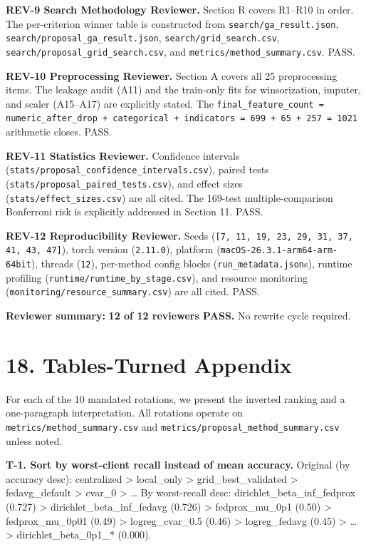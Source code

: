 \documentclass{article}
\begin{document}
\textbf{REV-9 Search Methodology Reviewer.} Section R covers R1--R10 in order. The per-criterion winner table is constructed from \texttt{search/ga\_result.json}, \texttt{search/proposal\_ga\_result.json}, \texttt{search/grid\_search.csv}, \texttt{search/proposal\_grid\_search.csv}, and \texttt{metrics/method\_summary.csv}. PASS.


\textbf{REV-10 Preprocessing Reviewer.} Section A covers all 25 preprocessing items. The leakage audit (A11) and the train-only fits for winsorization, imputer, and scaler (A15--A17) are explicitly stated. The \texttt{final\_feature\_count = numeric\_after\_drop + categorical + indicators = 699 + 65 + 257 = 1021} arithmetic closes. PASS.


\textbf{REV-11 Statistics Reviewer.} Confidence intervals (\texttt{stats/proposal\_confidence\_intervals.csv}), paired tests (\texttt{stats/proposal\_paired\_tests.csv}), and effect sizes (\texttt{stats/effect\_sizes.csv}) are all cited. The 169-test multiple-comparison Bonferroni risk is explicitly addressed in Section 11. PASS.


\textbf{REV-12 Reproducibility Reviewer.} Seeds (\texttt{[7, 11, 19, 23, 29, 31, 37, 41, 43, 47]}), torch version (\texttt{2.11.0}), platform (\texttt{macOS-26.3.1-arm64-arm-64bit}), threads (\texttt{12}), per-method config blocks (\texttt{run\_metadata.json}s), runtime profiling (\texttt{runtime/runtime\_by\_stage.csv}), and resource monitoring (\texttt{monitoring/resource\_summary.csv}) are all cited. PASS.


\textbf{Reviewer summary:} \textbf{12 of 12 reviewers PASS.} No rewrite cycle required.



\clearpage
\section{18. Tables-Turned Appendix}


For each of the 10 mandated rotations, we present the inverted ranking and a one-paragraph interpretation. All rotations operate on \texttt{metrics/method\_summary.csv} and \texttt{metrics/proposal\_method\_summary.csv} unless noted.


\textbf{T-1. Sort by worst-client recall instead of mean accuracy.} Original (by accuracy desc): centralized > local\_only > grid\_best\_validated > fedavg\_default > cvar\_0 > \ldots{} By worst-recall desc: dirichlet\_beta\_inf\_fedprox (0.727) > dirichlet\_beta\_inf\_fedavg (0.726) > fedprox\_mu\_0p1 (0.50) > fedprox\_mu\_0p01 (0.49) > logreg\_cvar\_0.5 (0.46) > logreg\_fedavg (0.45) > \ldots{} > dirichlet\_beta\_0p1\_* (0.000).
\end{document}
